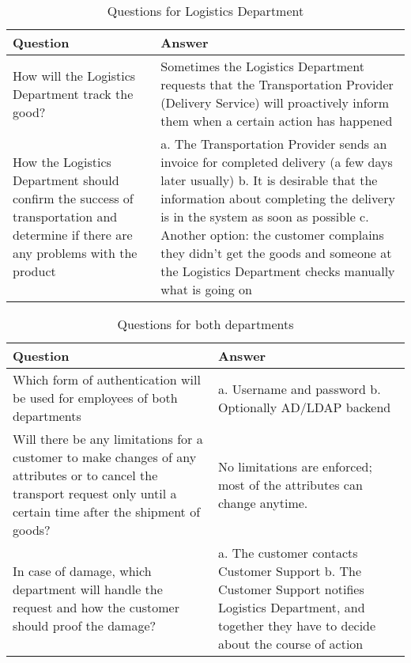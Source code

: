 \documentclass[a4paper]{article}
\begin{document}
        \begin{longtable}[c]{|p{}|p{}|}
           \caption{Questions for Logistics Department}
        \label{logisticsDepartmentQuestions} \\
        \hline
            Question & Answer \\
            \hline
            \endhead
            How will the Logistics Department track the good?  & Sometimes the Logistics Department requests that the Transportation Provider (Delivery Service) will proactively inform them when a certain action has happened \\
            \hline
            How the Logistics Department should confirm the success of transportation and determine if there are any problems with the product & 
            a. The Transportation Provider sends an invoice for completed delivery (a few days later usually) \newline
            b. It is desirable that the information about completing the delivery is in the system as soon as possible \newline
            c. Another option: the customer complains they didn’t get the goods and someone at the Logistics Department checks manually what is going on\\
            \hline
     
    \end{longtable}
    
  
        \begin{longtable}[c]{|p{}|p{}|}
          \caption{Questions for both departments}
        \label{questionsForBothDepartments} \\
            \hline
            Question & Answer \\
            \endhead
            \hline
            Which form of authentication will be used for employees of both departments & 
            a. Username and password \newline
            b. Optionally AD/LDAP backend \\
            \hline
            Will there be any limitations for a customer to make changes of any attributes or to cancel the transport request only until a certain time after the shipment of goods? & No limitations are enforced; most of the attributes can change anytime. \\
            \hline
            In case of damage, which department will handle the request and how the customer should proof the damage? & 
            a. The customer contacts Customer Support \newline
            b. The Customer Support notifies Logistics Department, and together they have to decide about the course of action \\
            \hline
      
    \end{longtable}
\end{document}
